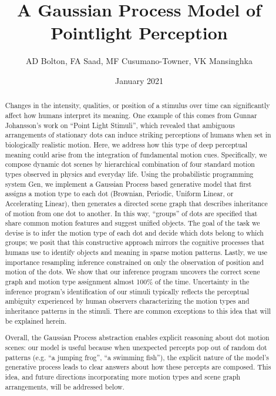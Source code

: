 \documentclass{scrartcl}
\title{A Gaussian Process Model of Pointlight Perception}
\author{AD Bolton, FA Saad, MF Cusumano-Towner, VK Mansinghka}
\date{January 2021}
\begin{document}
\maketitle

\begin{abstract}
  Changes in the intensity, qualities, or position of a stimulus over time can significantly affect how humans interpret its meaning. One example of this comes from Gunnar Johansson's work on ``Point Light Stimuli'', which revealed that ambiguous arrangements of stationary dots can induce striking perceptions of humans when set in biologically realistic motion. Here, we address how this type of deep perceptual meaning could arise from the integration of fundamental motion cues. Specifically, we compose dynamic dot scenes by hierarchical combination of four standard motion types observed in physics and everyday life. Using the probabilistic programming system Gen, we implement a Gaussian Process based generative model that first assigns a motion type to each dot (Brownian, Periodic, Uniform Linear, or Accelerating Linear), then generates a directed scene graph that describes inheritance of motion from one dot to another. In this way, ``groups'' of dots are specified that share common motion features and suggest unified objects. The goal of the task we devise is to infer the motion type of each dot and decide which dots belong to which groups; we posit that this constructive approach mirrors the cognitive processes that humans use to identify objects and meaning in sparse motion patterns. Lastly, we use importance resampling inference constrained on only the observation of position and motion of the dots. We show that our inference program uncovers the correct scene graph and motion type assignment almost 100\% of the time. Uncertainty in the inference program's identification of our stimuli typically reflects the perceptual ambiguity experienced by human observers characterizing the motion types and inheritance patterns in the stimuli. There are common exceptions to this idea that will be explained herein. 

  Overall, the Gaussian Process abstraction enables explicit reasoning about dot motion scenes: our model is useful because when unexpected percepts pop out of random dot patterns (e.g. ``a jumping frog'', ``a swimming fish''), the explicit nature of the model's generative process leads to clear answers about how these percepts are composed. This idea, and future directions incorporating more motion types and scene graph arrangements, will be addressed below. 

\end{abstract}
\end{document}
